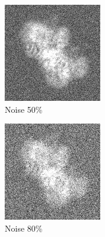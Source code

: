 \documentclass[twoside]{iitbreport}
\begin{document}
\begin{figure}[h]
\begin{subfigure}{.3\textwidth}
\centering
\includegraphics[width=0.8\linewidth]{Emd_4138_proj1_noise_50.jpg}
\captionsetup{justification=centering}
\caption{ Noise 50\% }
\end{subfigure} 
\begin{subfigure}{.27\textwidth}
\centering
\includegraphics[width=0.8\linewidth]{Emd_4138_proj1_noise_80.jpg}
\captionsetup{justification=centering}
\caption{ Noise 80\%}
\end{subfigure}
\begin{subfigure}{.28\textwidth}
\centering

\end{subfigure}
\end{figure}
\end{document}
